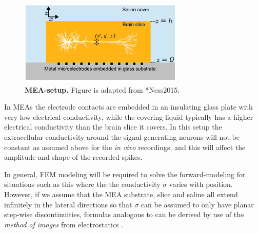 \begin{figure}[!ht]
\begin{center}
\includegraphics[width=0.7\textwidth]{Figures/Spikes/Spikes-MEA-1-w43-r300}
\end{center}
\caption[]{\textbf{MEA-setup.}
Figure is adapted from \citeasnoun**{Ness2015}.}
\label{fig:Spikes:MEA-setup}
\end{figure}

In MEAs the electrode contacts are embedded in an insulating glass plate with very 
low electrical conductivity, while the covering liquid typically has a higher electrical conductivity than the brain slice it covers. 
In this setup the extracellular conductivity around the signal-generating neurons will not be constant 
as assumed above for the \textit{in vivo} recordings, 
and this will affect the amplitude and shape of the recorded spikes. 

In general, FEM modeling will be required to solve the forward-modeling for situations such as this where
the the conductivity $\sigma$ varies with position. However, if we assume that the MEA substrate, 
slice and saline all extend infinitely in the lateral directions so that $\sigma$ can be assumed to only have planar 
step-wise discontinuities, formulas analogous to  can be derived by use of the \emph{method of images} from electrostatics . 


